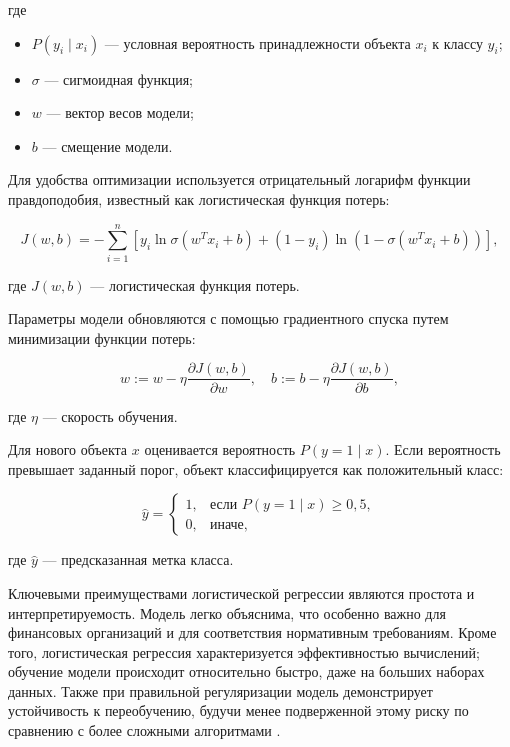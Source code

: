 где
\begin{itemize}
  \item $P(y_i \mid x_i)$ --- условная вероятность принадлежности объекта $x_i$ к классу $y_i$;
  \item $\sigma$ --- сигмоидная функция;
  \item $w$ --- вектор весов модели;
  \item $b$ --- смещение модели.
\end{itemize}

Для удобства оптимизации используется отрицательный логарифм функции правдоподобия, известный как логистическая функция потерь:

\begin{equation}
  J(w, b) = -\sum_{i=1}^{n} \left[
    y_i \ln \sigma(w^T x_i + b) +
    (1 - y_i) \ln \left(1 - \sigma(w^T x_i + b)\right)
    \right],
\end{equation}

где $J(w, b)$ --- логистическая функция потерь.

Параметры модели обновляются с помощью градиентного спуска путем минимизации функции потерь:

\begin{equation}
  w := w - \eta \frac{\partial J(w, b)}{\partial w}, \quad
  b := b - \eta \frac{\partial J(w, b)}{\partial b},
\end{equation}

где $\eta$ --- скорость обучения.

Для нового объекта $x$ оценивается вероятность $P(y = 1 \mid x)$. Если вероятность превышает заданный порог, объект классифицируется как положительный класс:

\begin{equation}
  \hat{y} =
  \begin{cases}
    1, & \text{если } P(y = 1 \mid x) \geqslant 0{,}5, \\
    0, & \text{иначе},
  \end{cases}
\end{equation}

где $\hat{y}$ --- предсказанная метка класса.

Ключевыми преимуществами логистической регрессии являются простота и интерпретируемость. Модель легко объяснима, что особенно важно для финансовых организаций и для соответствия нормативным требованиям. Кроме того, логистическая регрессия характеризуется эффективностью вычислений; обучение модели происходит относительно быстро, даже на больших наборах данных. Также при правильной регуляризации модель демонстрирует устойчивость к переобучению, будучи менее подверженной этому риску по сравнению с более сложными алгоритмами \cite{Marmish}.

